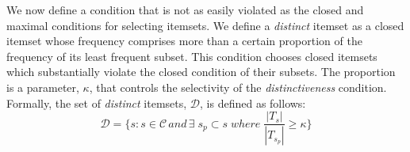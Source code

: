 \documentclass{sig-alternate}
\begin{document}
We now define a condition that is not as easily violated as the closed and maximal conditions for selecting itemsets.
We define a \emph{distinct} itemset as a closed itemset whose frequency comprises more than a certain proportion of the frequency of its least frequent subset. 
This condition chooses closed itemsets which substantially violate the closed condition of their subsets. The proportion is a parameter, $\kappa$, that controls the selectivity of the \emph{distinctiveness} condition. Formally, the set of \emph{distinct} itemsets, $\mathcal{D}$, is defined as follows:
\begin{equation}\mathcal{D} = \{s: s \in \mathcal{C} \, and \, \exists \; s_{p} \subset s \; where \; \frac{|T_{s}|}{|T_{s_{p}}|} \ge \kappa %
\}\end{equation}
\end{document}
